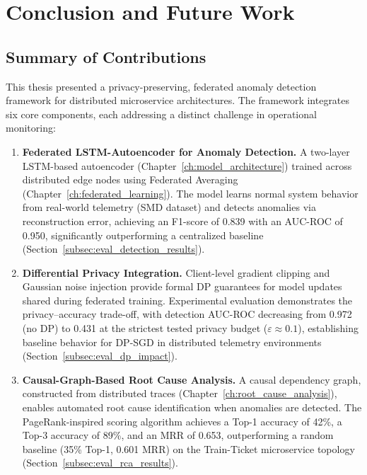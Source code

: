 \chapter{Conclusion and Future Work}
\label{ch:conclusion}

\section{Summary of Contributions}
\label{sec:conclusion_summary}

This thesis presented a privacy-preserving, federated anomaly detection
framework for distributed microservice architectures. The framework
integrates six core components, each addressing a distinct challenge in
operational monitoring:

\begin{enumerate}
    \item \textbf{Federated LSTM-Autoencoder for Anomaly Detection.} A
    two-layer LSTM-based autoencoder (Chapter~\ref{ch:model_architecture})
    trained across distributed edge nodes using Federated Averaging
    (Chapter~\ref{ch:federated_learning}). The model learns normal system
    behavior from real-world telemetry (SMD dataset) and detects anomalies
    via reconstruction error, achieving an F1-score of 0.839 with an
    AUC-ROC of 0.950, significantly outperforming a centralized baseline
    (Section~\ref{subsec:eval_detection_results}).

    \item \textbf{Differential Privacy Integration.} Client-level gradient
    clipping and Gaussian noise injection provide formal DP guarantees for
    model updates shared during federated training. Experimental evaluation
    demonstrates the privacy--accuracy trade-off, with detection AUC-ROC
    decreasing from 0.972 (no DP) to 0.431 at the strictest tested privacy
    budget ($\varepsilon \approx 0.1$), establishing baseline behavior for DP-SGD
    in distributed telemetry environments
    (Section~\ref{subsec:eval_dp_impact}).

    \item \textbf{Causal-Graph-Based Root Cause Analysis.} A causal dependency
    graph, constructed from distributed traces
    (Chapter~\ref{ch:root_cause_analysis}), enables automated root cause
    identification when anomalies are detected. The PageRank-inspired scoring
    algorithm achieves a Top-1 accuracy of 42\%, a Top-3 accuracy of 89\%,
    and an MRR of 0.653, outperforming a random baseline (35\% Top-1, 0.601
    MRR) on the Train-Ticket microservice topology
    (Section~\ref{subsec:eval_rca_results}).


\end{enumerate}
